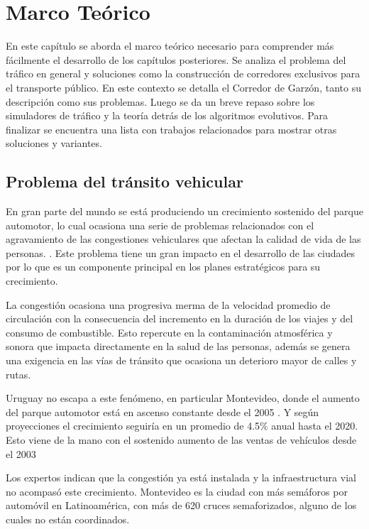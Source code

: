 \chapter{Marco Teórico}
En este capítulo se aborda el marco teórico necesario para comprender más fácilmente el desarrollo de los capítulos posteriores. Se analiza el problema del tráfico en general y soluciones como la construcción de corredores exclusivos para el transporte público. En este contexto se detalla el Corredor de Garzón, tanto su descripción como sus problemas. Luego se da un breve repaso sobre los simuladores de tráfico y la teoría detrás de los algoritmos evolutivos. Para finalizar se encuentra una lista con trabajos relacionados para mostrar otras soluciones y variantes.
\section{Problema del tránsito vehicular}

En gran parte del mundo se está produciendo un crecimiento sostenido del parque automotor, lo cual ocasiona una serie de problemas relacionados con el agravamiento de las congestiones vehiculares que afectan la calidad de vida de las personas.  \citep{Cepal2003}. Este problema tiene un gran impacto en el desarrollo de las ciudades por lo que es un componente principal en los planes estratégicos para su crecimiento.

La congestión ocasiona una progresiva merma de la velocidad promedio de circulación con la consecuencia del incremento en la duración de los viajes y del consumo de combustible. Esto repercute en la contaminación atmosférica y sonora que impacta directamente en la salud de las personas, además se genera una exigencia en las vías de tránsito que ocasiona un deterioro mayor de calles y rutas.

Uruguay no escapa a este fenómeno, en particular Montevideo, donde el aumento del parque automotor está en ascenso constante desde el 2005 \citep{INE2014}. Y según proyecciones el crecimiento seguiría en un promedio de 4.5\% anual hasta el 2020. \citep{BBVA2013} Esto viene de la mano con el sostenido aumento de las ventas de vehículos  desde el 2003 \citep{Autoanuario2014}

Los expertos indican que la congestión ya está instalada y la infraestructura vial no acompasó este crecimiento. Montevideo es la ciudad con más semáforos por automóvil en Latinoamérica, con más de 620 cruces semaforizados, alguno de los cuales no están coordinados.\citep{Subrayado2013}


